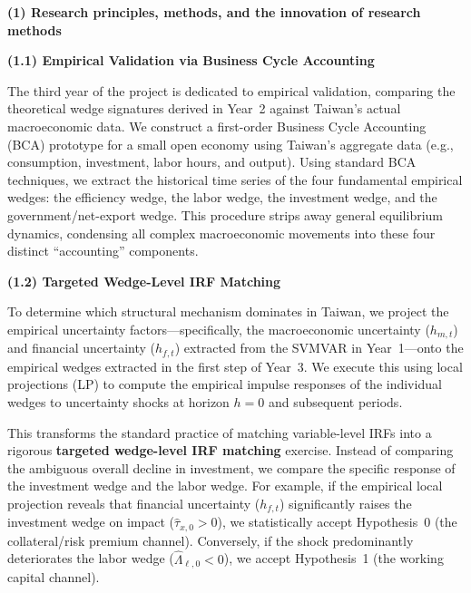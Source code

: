 %
%

\noindent\textbf{(1) Research principles, methods, and the innovation of research methods}

\bigskip

\noindent\textbf{(1.1) Empirical Validation via Business Cycle Accounting}

\medskip

The third year of the project is dedicated to empirical validation, comparing the theoretical wedge signatures derived in Year~2 against Taiwan's actual macroeconomic data. We construct a first-order Business Cycle Accounting (BCA) prototype for a small open economy using Taiwan's aggregate data (e.g., consumption, investment, labor hours, and output). Using standard BCA techniques, we extract the historical time series of the four fundamental empirical wedges: the efficiency wedge, the labor wedge, the investment wedge, and the government/net-export wedge. This procedure strips away general equilibrium dynamics, condensing all complex macroeconomic movements into these four distinct ``accounting'' components.

\bigskip

\noindent\textbf{(1.2) Targeted Wedge-Level IRF Matching}

\medskip

To determine which structural mechanism dominates in Taiwan, we project the empirical uncertainty factors---specifically, the macroeconomic uncertainty ($h_{m,t}$) and financial uncertainty ($h_{f,t}$) extracted from the SVMVAR in Year~1---onto the empirical wedges extracted in the first step of Year~3. We execute this using local projections (LP) to compute the empirical impulse responses of the individual wedges to uncertainty shocks at horizon $h=0$ and subsequent periods.

This transforms the standard practice of matching variable-level IRFs into a rigorous \textbf{targeted wedge-level IRF matching} exercise. Instead of comparing the ambiguous overall decline in investment, we compare the specific response of the investment wedge and the labor wedge. For example, if the empirical local projection reveals that financial uncertainty ($h_{f,t}$) significantly raises the investment wedge on impact ($\hat\tau_{x,0} > 0$), we statistically accept Hypothesis~0 (the collateral/risk premium channel). Conversely, if the shock predominantly deteriorates the labor wedge ($\hat\Lambda_{\ell,0} < 0$), we accept Hypothesis~1 (the working capital channel). 

